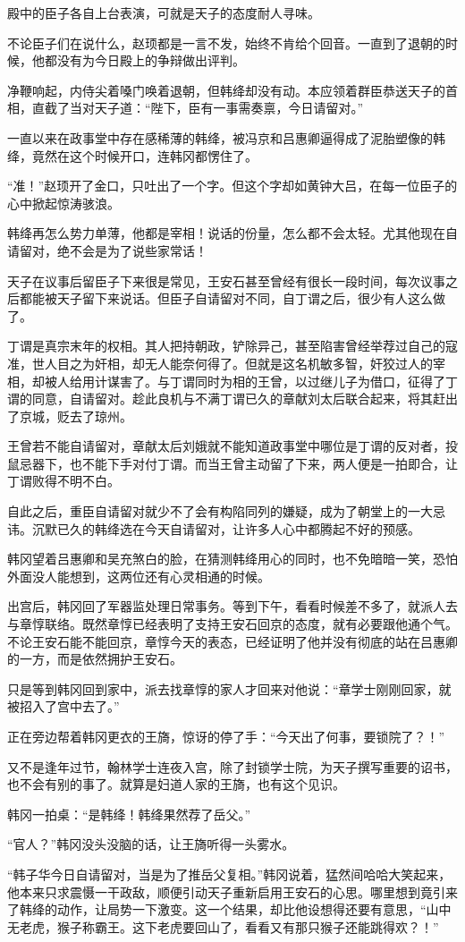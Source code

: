 殿中的臣子各自上台表演，可就是天子的态度耐人寻味。

不论臣子们在说什么，赵顼都是一言不发，始终不肯给个回音。一直到了退朝的时候，他都没有为今日殿上的争辩做出评判。

净鞭响起，内侍尖着嗓门唤着退朝，但韩绛却没有动。本应领着群臣恭送天子的首相，直截了当对天子道：“陛下，臣有一事需奏禀，今日请留对。”

一直以来在政事堂中存在感稀薄的韩绛，被冯京和吕惠卿逼得成了泥胎塑像的韩绛，竟然在这个时候开口，连韩冈都愣住了。

“准！”赵顼开了金口，只吐出了一个字。但这个字却如黄钟大吕，在每一位臣子的心中掀起惊涛骇浪。

韩绛再怎么势力单薄，他都是宰相！说话的份量，怎么都不会太轻。尤其他现在自请留对，绝不会是为了说些家常话！

天子在议事后留臣子下来很是常见，王安石甚至曾经有很长一段时间，每次议事之后都能被天子留下来说话。但臣子自请留对不同，自丁谓之后，很少有人这么做了。

丁谓是真宗末年的权相。其人把持朝政，铲除异己，甚至陷害曾经举荐过自己的寇准，世人目之为奸相，却无人能奈何得了。但就是这名机敏多智，奸狡过人的宰相，却被人给用计谋害了。与丁谓同时为相的王曾，以过继儿子为借口，征得了丁谓的同意，自请留对。趁此良机与不满丁谓已久的章献刘太后联合起来，将其赶出了京城，贬去了琼州。

王曾若不能自请留对，章献太后刘娥就不能知道政事堂中哪位是丁谓的反对者，投鼠忌器下，也不能下手对付丁谓。而当王曾主动留了下来，两人便是一拍即合，让丁谓败得不明不白。

自此之后，重臣自请留对就少不了会有构陷同列的嫌疑，成为了朝堂上的一大忌讳。沉默已久的韩绛选在今天自请留对，让许多人心中都腾起不好的预感。

韩冈望着吕惠卿和吴充煞白的脸，在猜测韩绛用心的同时，也不免暗暗一笑，恐怕外面没人能想到，这两位还有心灵相通的时候。

出宫后，韩冈回了军器监处理日常事务。等到下午，看看时候差不多了，就派人去与章惇联络。既然章惇已经表明了支持王安石回京的态度，就有必要跟他通个气。不论王安石能不能回京，章惇今天的表态，已经证明了他并没有彻底的站在吕惠卿的一方，而是依然拥护王安石。

只是等到韩冈回到家中，派去找章惇的家人才回来对他说：“章学士刚刚回家，就被招入了宫中去了。”

正在旁边帮着韩冈更衣的王旖，惊讶的停了手：“今天出了何事，要锁院了？！”

又不是逢年过节，翰林学士连夜入宫，除了封锁学士院，为天子撰写重要的诏书，也不会有别的事了。就算是妇道人家的王旖，也有这个见识。

韩冈一拍桌：“是韩绛！韩绛果然荐了岳父。”

“官人？”韩冈没头没脑的话，让王旖听得一头雾水。

“韩子华今日自请留对，当是为了推岳父复相。”韩冈说着，猛然间哈哈大笑起来，他本来只求震慑一干政敌，顺便引动天子重新启用王安石的心思。哪里想到竟引来了韩绛的动作，让局势一下激变。这一个结果，却比他设想得还要有意思，“山中无老虎，猴子称霸王。这下老虎要回山了，看看又有那只猴子还能跳得欢？！”

